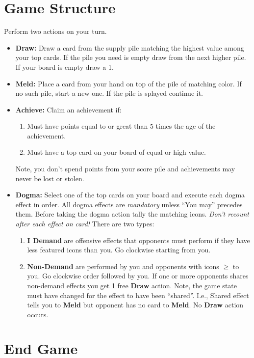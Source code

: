 \documentclass[12pt]{article}
\newenvironment{enumerateCustom}
{\begin{enumerate}
  \setlength{\itemsep}{1pt}
  \setlength{\parskip}{0pt}
  \setlength{\parsep}{0pt}}
{\end{enumerate}}
\newenvironment{itemizeCustom}
{\begin{itemize}
  \setlength{\itemsep}{1pt}
  \setlength{\parskip}{0pt}
  \setlength{\parsep}{0pt}}
{\end{itemize}}
\begin{document}
\begin{mdframed}[style = customFrame]
\begin{multicols*}{2}
\section*{Game Structure}
Perform two actions on your turn.
\begin{itemizeCustom}
	\item \textbf{Draw:} Draw a card from the supply pile matching the highest value among your top cards. If the pile you need is empty draw from the next higher pile. If your board is empty draw a 1.
	\item \textbf{Meld:} Place a card from your hand on top of the pile of matching color. If no such pile, start a new one. If the pile is splayed continue it. 
	\item \textbf{Achieve:} Claim an achievement if:
		\begin{enumerateCustom}
			\item Must have points equal to or great than 5 times the age of the achievement.
			\item Must have a top card on your board of equal or high value.
		\end{enumerateCustom}
		Note, you don't spend points from your score pile and achievements may never be lost or stolen.
	\item \textbf{Dogma:} Select one of the top cards on your board and execute each dogma effect in order. All dogma effects are \emph{mandatory} unless ``You may'' precedes them. Before taking the dogma action tally the matching icons. \emph{Don't recount after each effect on card!} There are two types:
		\begin{enumerateCustom}
			\item \textbf{I Demand} are offensive effects that opponents must perform if they have less featured icons than you. Go clockwise starting from you.
			\item \textbf{Non-Demand} are performed by you and opponents with icons $\ge$ to you. Go clockwise order followed by you. If one or more opponents shares non-demand effects you get 1 free \textbf{Draw} action. Note, the game state must have changed for the effect to have been ``shared''. I.e., Shared effect tells you to \textbf{Meld} but opponent has no card to \textbf{Meld}. No \textbf{Draw} action occurs.
		\end{enumerateCustom}
\end{itemizeCustom}
\section*{End Game}

\end{multicols*}
\end{mdframed}
\end{document}
